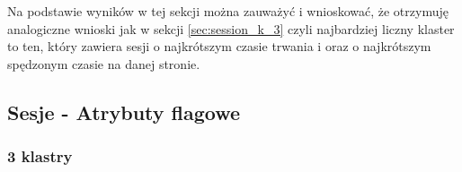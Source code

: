 \documentclass[../EDI_Task1_Karwowski_Kowalewski.tex]{subfiles}
\begin{document}
{{{            Na podstawie wyników w tej sekcji można zauważyć i wnioskować, że
            otrzymuję analogiczne wnioski jak w sekcji \ref{sec:session_k_3} czyli
            najbardziej liczny klaster to ten, który zawiera sesji o najkrótszym
            czasie trwania i oraz o najkrótszym spędzonym czasie na danej stronie.
        }
    }

    \subsection{Sesje - Atrybuty flagowe} {

        \subsubsection{3 klastry}
        \label{sec:session_flag_k_3} {

}}}
\end{document}
